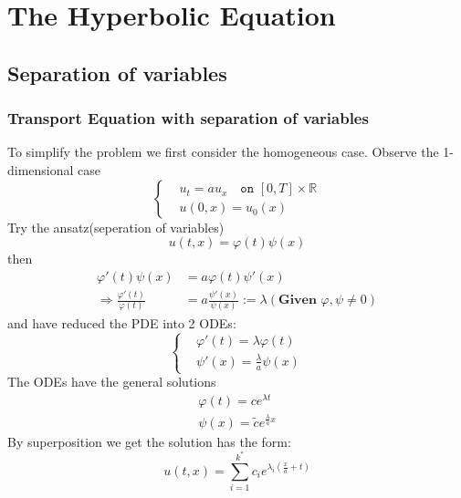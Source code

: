 \documentclass[a4paper,11pt,oneside,fleqn]{book}
\theoremstyle{definition}
\theoremstyle{remark}
\begin{document}
  

\section{The Hyperbolic Equation}
\subsection{Separation of variables}
\subsubsection{Transport Equation with separation of variables}
To simplify the problem we first consider the homogeneous case. Observe the 1-dimensional case
\begin{equation*}
\left\{
\begin{aligned}
	&u_t = a u_x \quad \texttt{on } [0, T] \times \mathbb{R} \\
	&u(0, x) = u_0(x)
\end{aligned}
\right.
\end{equation*}
Try the ansatz(seperation of variables) 
\begin{equation*}
	u(t, x) = \varphi(t) \psi(x)
\end{equation*}
then
\begin{align*}
	\varphi'(t) \psi(x) &= a\varphi(t) \psi'(x)\\
	\Rightarrow \frac{\varphi'(t)}{\varphi(t)} &= a\frac{\psi'(x)}{\psi(x)} := \lambda (\textbf{Given } \varphi, \psi \neq 0)
\end{align*}
and have reduced the PDE into 2 ODEs:
\begin{equation*}
	\left\{
	\begin{aligned}
		&\varphi'(t) = \lambda \varphi(t)\\
		&\psi'(x) = \frac{\lambda}{a} \psi(x) 
	\end{aligned}
	\right.
\end{equation*}
The ODEs have the general solutions 
\begin{equation*}
	\begin{aligned}
		\varphi(t) = c e^{\lambda t}\\
		\psi(x) = \tilde{c} e^{\frac{\lambda}{a} x}
	\end{aligned}
\end{equation*}
By superposition we get the solution has the form:
\begin{equation*}
	u(t, x) = \sum_{i = 1}^{k^*} c_i e^{\lambda_i(\frac{x}{a} + t)}
\end{equation*}
\end{document}
